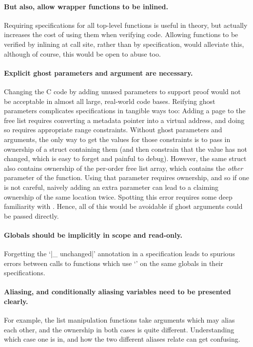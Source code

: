 \paragraph{But also, allow wrapper functions to be inlined.} Requiring
specifications for all top-level functions is useful in theory, but actually
increases the cost of using them when verifying code. Allowing functions to be
verified by inlining at call site, rather than by specification, would
alleviate this, although of course, this would be open to abuse too.

\paragraph{Explicit ghost parameters and argument are necessary.} Changing the
C code by adding unused parameters to support proof would not be acceptable in
almost all large, real-world code bases. Reifying ghost parameters complicates
specifications in tangible ways too: Adding a page to the free list requires
converting a metadata pointer into a virtual address, and doing so requires
appropriate range constraints. Without ghost parameters and arguments, the only
way to get the values for those constraints is to pass in ownership of a struct
containing them (and then constrain that the value has not changed, which is
easy to forget and painful to debug). However, the same struct also contains
ownership of the per-order free list array, which contains the \emph{other}
parameter of the function. Using that parameter requires ownership, and so if
one is not careful, naively adding an extra parameter can lead to a claiming
ownership of the same location twice. Spotting this error requires some deep familiarity with .
Hence, all of this would be avoidable if ghost arguments could be passed
directly.

\paragraph{Globals should be implicitly in scope and read-only.} Forgetting the
`\cninline|{_} unchanged|' annotation in a specification leads to spurious
errors between calls to functions which use `' on the same
globals in their specifications.

\paragraph{Aliasing, and conditionally aliasing variables need to be presented
clearly.} For example, the list manipulation functions take arguments which may
alias each other, and the ownership in both cases is quite different.
Understanding which case one is in, and how the two different aliases relate
can get confusing.

